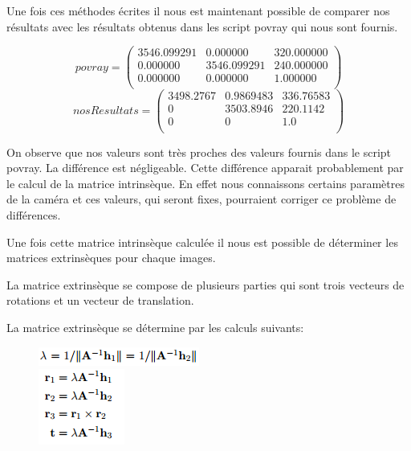 \documentclass[a4paper,12pt]{report}
\begin{document}
Une fois ces méthodes écrites il nous est maintenant possible de comparer nos résultats avec les résultats obtenus dans les script povray qui nous sont fournis.

\begin{center}
\[
	povray=\left (
	\begin{array}{ccc}
		3546.099291 & 0.000000    & 320.000000    \\
		0.000000    & 3546.099291 & 240.000000   \\
		0.000000    & 0.000000    & 1.000000    \\
	\end{array}
	\right )
\]
\[
	nosResultats=\left (
	\begin{array}{ccc}
		3498.2767 & 0.9869483 & 336.76583 \\
        0 & 3503.8946 & 220.1142 \\
        0 & 0 & 1.0 \\
	\end{array}
	\right )	
\]
\end{center}

On observe que nos valeurs sont très proches des valeurs fournis dans le script povray. La différence est négligeable. Cette différence apparait probablement par le calcul de la matrice intrinsèque. En effet nous connaissons certains paramètres de la caméra et ces valeurs, qui seront fixes, pourraient corriger ce problème de différences.

Une fois cette matrice intrinsèque calculée il nous est possible de déterminer les matrices extrinsèques pour chaque images.

La matrice extrinsèque se compose de plusieurs parties qui sont trois vecteurs de rotations et un vecteur de translation.

La matrice extrinsèque se détermine par les calculs suivants:

\begin{figure}[!ht]
	\center
	\includegraphics[scale=1]{./image/lambdaForm.png}\\
	\includegraphics[scale=1]{./image/extrinsequeForm.png}
\end{figure}
\end{document}
